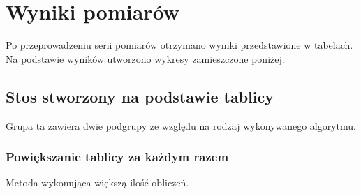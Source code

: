 \documentclass[12pt,a4paper,titlepage]{article}
\begin{document}
\section{Wyniki pomiarów}
Po przeprowadzeniu serii pomiarów otrzymano wyniki przedstawione w tabelach. Na podstawie wyników utworzono wykresy zamieszczone poniżej.


\subsection{Stos stworzony na podstawie tablicy}
Grupa ta zawiera dwie podgrupy ze względu na rodzaj wykonywanego algorytmu.


\subsubsection{Powiększanie tablicy za każdym razem}
Metoda wykonująca większą ilość obliczeń.
\end{document}
